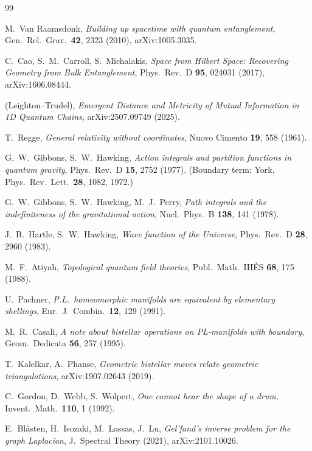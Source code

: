 \documentclass[11pt]{article}
\theoremstyle{definition}
\theoremstyle{plain}
\begin{document}
\begin{thebibliography}{99}
\small

 M.~Van Raamsdonk,
\emph{Building up spacetime with quantum entanglement}, Gen.\ Rel.\ Grav.\ \textbf{42}, 2323 (2010), arXiv:1005.3035.

 C.~Cao, S.~M.~Carroll, S.~Michalakis,
\emph{Space from Hilbert Space: Recovering Geometry from Bulk Entanglement}, Phys.\ Rev.\ D \textbf{95}, 024031 (2017), arXiv:1606.08444.

 (Leighton--Trudel),
\emph{Emergent Distance and Metricity of Mutual Information in 1D Quantum Chains}, arXiv:2507.09749 (2025).

 T.~Regge,
\emph{General relativity without coordinates}, Nuovo Cimento \textbf{19}, 558 (1961).

 G.~W.~Gibbons, S.~W.~Hawking,
\emph{Action integrals and partition functions in quantum gravity}, Phys.\ Rev.\ D \textbf{15}, 2752 (1977). (Boundary term: York, Phys.\ Rev.\ Lett.\ \textbf{28}, 1082, 1972.)

 G.~W.~Gibbons, S.~W.~Hawking, M.~J.~Perry,
\emph{Path integrals and the indefiniteness of the gravitational action}, Nucl.\ Phys.\ B \textbf{138}, 141 (1978).

 J.~B.~Hartle, S.~W.~Hawking,
\emph{Wave function of the Universe}, Phys.\ Rev.\ D \textbf{28}, 2960 (1983).

 M.~F.~Atiyah,
\emph{Topological quantum field theories}, Publ.\ Math.\ IH\'ES \textbf{68}, 175 (1988).

 U.~Pachner,
\emph{P.L.\ homeomorphic manifolds are equivalent by elementary shellings}, Eur.\ J.\ Combin.\ \textbf{12}, 129 (1991).

 M.~R.~Casali,
\emph{A note about bistellar operations on PL-manifolds with boundary}, Geom.\ Dedicata \textbf{56}, 257 (1995).

 T.~Kalelkar, A.~Phanse,
\emph{Geometric bistellar moves relate geometric triangulations}, arXiv:1907.02643 (2019).

 C.~Gordon, D.~Webb, S.~Wolpert,
\emph{One cannot hear the shape of a drum}, Invent.\ Math.\ \textbf{110}, 1 (1992).

 E.~Bl\aa sten, H.~Isozaki, M.~Lassas, J.~Lu,
\emph{Gel'fand's inverse problem for the graph Laplacian}, J.\ Spectral Theory (2021), arXiv:2101.10026.


\end{thebibliography}
\end{document}

